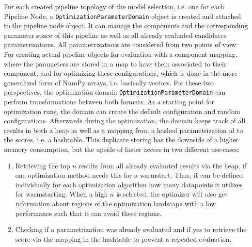 For each created pipeline topology of the model selection, i.e. one for each Pipeline Node, a \texttt{OptimizationParameterDomain} object is created and attached to the pipeline node object.
It can manage the components and the corresponding parameter space of this pipeline as well as all already evaluated candidates parametrizations.\newline
All parametrizations are considered from two points of view: For creating actual pipeline objects for evaluation with a component mapping, where the parameters are stored in a map to have them associated to their component, and for optimizing these configurations, which is done in the more generalized form of NumPy arrays, i.e. basically vectors.
For these two perspectives, the optimization domain \texttt{OptimizationParameterDomain} can perform transformations between both formats.\newline
As a starting point for optimization runs, the domain can create the default configuration and random configurations.
Afterwards during the optimization, the domain keeps track of all results in both a heap as well as a mapping from a hashed parametrization id to the scores, i.e. a hashtable.
This duplicate storing has the downside of a higher memory consumption, but the upside of faster access in two different use-cases:
\begin{enumerate}
    \item Retrieving the top $n$ results from all already evaluated results via the heap, if one optimization method needs this for a warmstart. Thus, it can be defined individually for each optimization algorithm how many datapoints it utilizes for warmstarting. When a high $n$ is selected, the optimizer will also get information about regions of the optimization landscape with a low performance such that it can avoid these regions.
    \item Checking if a parametrization was already evaluated and if yes to retrieve the score via the mapping in the hashtable to prevent a repeated evaluation.
\end{enumerate}

